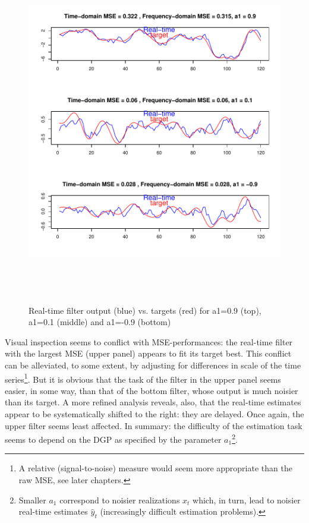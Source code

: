 \documentclass[a4paper]{book}
\begin{document}
\begin{enumerate}
\begin{figure}[H]\begin{center}\includegraphics[height=6in, width=6in]{z_dfa_ar1_sym_output}\caption{Real-time filter output (blue) vs. targets (red) for a1=0.9 (top), a1=0.1 (middle) and a1=-0.9 (bottom)\label{z_dfa_ar1_sym_output}}\end{center}\end{figure}Visual inspection seems to conflict with MSE-performances: the real-time filter with the largest MSE (upper panel) appears to fit its target best. This conflict can be alleviated, to some extent, by adjusting for differences in scale of the time series\footnote{A relative (signal-to-noise) measure would seem more appropriate than the raw MSE, see later chapters.}. But it is obvious that the task of the filter in the upper panel seems easier, in some way, than that of the bottom filter, whose output is much noisier than its target. A more refined analysis reveals, also, that the real-time estimates appear to be systematically shifted to the right: they are delayed. Once again, the upper filter seems least affected. In summary: the difficulty of the estimation task seems to depend on the DGP as specified by the parameter $a_1$\footnote{Smaller $a_1$ correspond to noisier realizations $x_t$ which, in turn, lead to noisier real-time estimates $\hat{y}_t$ (increasingly difficult estimation problems).}. 

\end{enumerate}
\end{document}
